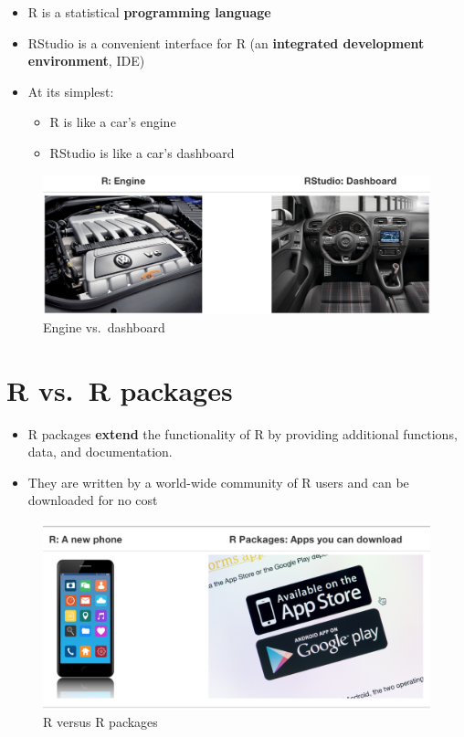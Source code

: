 \documentclass[]{book}
\providecommand{\tightlist}{%
  \setlength{\itemsep}{0pt}\setlength{\parskip}{0pt}}
\begin{document}
\begin{itemize}
\tightlist
\item
  R is a statistical \textbf{programming language}
\item
  RStudio is a convenient interface for R (an \textbf{integrated development environment}, IDE)
\item
  At its simplest:

  \begin{itemize}
  \tightlist
  \item
    R is like a car's engine
  \item
    RStudio is like a car's dashboard
  \end{itemize}
\end{itemize}

\begin{figure}
\centering
\includegraphics{img/engine-dashboard.png}
\caption{Engine vs.~dashboard}
\end{figure}

\hypertarget{r-vs.r-packages}{%
\section{R vs.~R packages}\label{r-vs.r-packages}}

\begin{itemize}
\item
  R packages \textbf{extend} the functionality of R by providing additional functions, data, and documentation.
\item
  They are written by a world-wide community of R users and can be downloaded for no cost
\end{itemize}

\begin{figure}
\centering
\includegraphics{img/r_vs_r_packages.png}
\caption{R versus R packages}
\end{figure}
\end{document}
